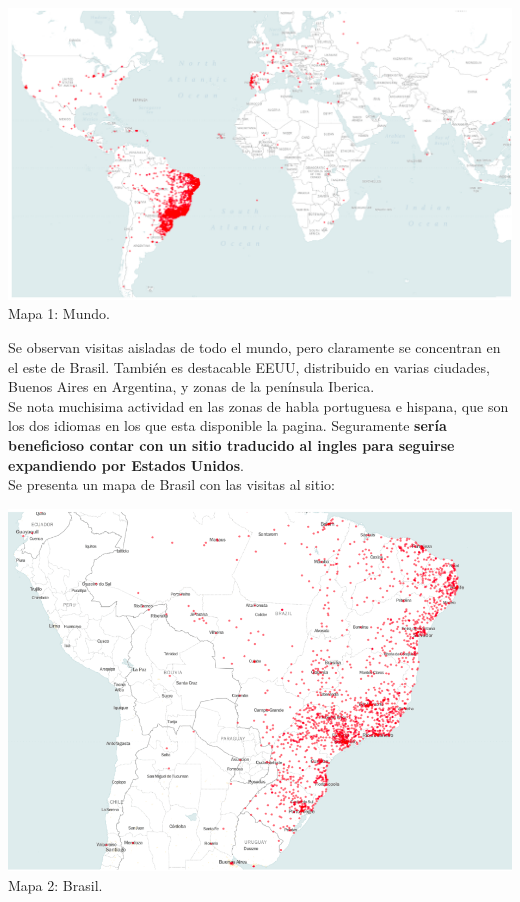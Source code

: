 \documentclass[a4paper ,12pt]{article}
\begin{document}
\begin{center}
	\includegraphics[width=1.2\linewidth]{map_1}
	\\Mapa 1: Mundo.
	
\end{center}

Se observan visitas aisladas de todo el mundo, pero claramente se concentran en el este de Brasil. También es destacable EEUU, distribuido en varias ciudades, Buenos Aires en Argentina, y zonas de la península Iberica.\\

Se nota muchisima actividad en las zonas de habla portuguesa e hispana, que son los dos idiomas en los que esta disponible la pagina. Seguramente \textbf{sería beneficioso contar con un sitio traducido al ingles para seguirse expandiendo por Estados Unidos}.\\

\newpage
Se presenta un mapa de Brasil con las visitas al sitio:

\begin{center}
	\includegraphics[width=1.1\linewidth]{map_2}
	\\Mapa 2: Brasil.
	
\end{center}
\end{document}
